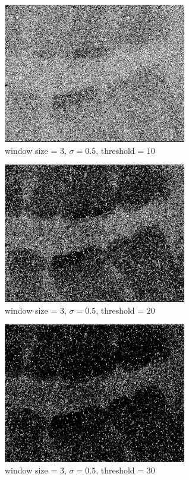 \documentclass[conference]{IEEEtran}
\begin{document}
\begin{figure}[H]
\centerline{\includegraphics[width=8cm]{dentalXray10.png}}
\caption{window size = $3$, $\sigma=0.5$,  threshold = $10$}
\label{dentalXray10}
\end{figure}

\begin{figure}[H]
\centerline{\includegraphics[width=8cm]{dentalXray11.png}}
\caption{window size = $3$, $\sigma=0.5$,  threshold = $20$}
\label{dentalXray11}
\end{figure}

\begin{figure}[H]
\centerline{\includegraphics[width=8cm]{dentalXray12.png}}
\caption{window size = $3$, $\sigma=0.5$,  threshold = $30$}
\label{dentalXray12}
\end{figure}
\end{document}
